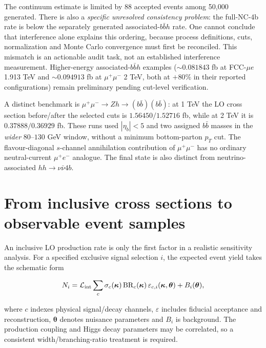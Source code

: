 \documentclass[12pt,a4paper]{article}
\newcommand{\newnote}{\clearpage}
\newcommand{\eps}{\varepsilon}
\newcommand{\Lumi}{\mathcal{L}}
\begin{document}
The continuum estimate is limited by 88 accepted events among 50,000 generated. There is also a \emph{specific unresolved consistency problem}: the full-NC-4b rate is below the separately generated associated-$b\bar b h$ rate. One cannot conclude that interference alone explains this ordering, because process definitions, cuts, normalization and Monte Carlo convergence must first be reconciled. This mismatch is an actionable audit task, not an established interference measurement. Higher-energy associated-$b\bar b h$ examples ($\sim0.081843$ fb at FCC-$\mu e$ 1.913 TeV and $\sim0.094913$ fb at $\mu^+\mu^-$ 2 TeV, both at $+80\%$ in their reported configurations) remain preliminary pending cut-level verification.

A distinct benchmark is $\mu^+\mu^-\to Zh\to (b\bar b)(b\bar b)$: at 1 TeV the LO cross section before/after the selected cuts is $1.56450/1.52716$ fb, while at 2 TeV it is $0.37888/0.36929$ fb. These runs used $|\eta_b|<5$ and two assigned $b\bar b$ masses in the \emph{wider} $80$--$130$ GeV window, without a minimum bottom-parton $p_T$ cut. The flavour-diagonal $s$-channel annihilation contribution of $\mu^+\mu^-$ has no ordinary neutral-current $\mu^+e^-$ analogue. The final state is also distinct from neutrino-associated $hh\to\nu\bar\nu4b$.




\newnote

\section{From inclusive cross sections to observable event samples}


An inclusive LO production rate is only the first factor in a realistic sensitivity analysis. For a specified exclusive signal selection $i$, the expected event yield takes the schematic form

\begin{equation}
\label{eq:yields}
N_i=\Lumi_{\rm int}\sum_{c}\sigma_c(\bm\kappa)\,
\mathrm{BR}_c(\bm\kappa)\,\eps_{c,i}(\bm\kappa,\bm\theta)+B_i(\bm\theta),
\end{equation}

where $c$ indexes physical signal/decay channels, $\eps$ includes fiducial acceptance and reconstruction, $\bm\theta$ denotes nuisance parameters and $B_i$ is background. The production coupling and Higgs decay parameters may be correlated, so a consistent width/branching-ratio treatment is required.
\end{document}
